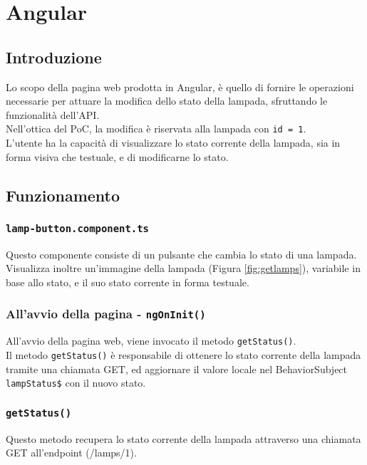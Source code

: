 \chapter{Angular}\label{angular}

\section{Introduzione}

Lo scopo della pagina web prodotta in Angular, è quello di fornire le operazioni necessarie per attuare la modifica dello stato della lampada, sfruttando le funzionalità dell'API. \\
Nell'ottica del PoC, la modifica è riservata alla lampada con \texttt{id = 1}. \\
L'utente ha la capacità di visualizzare lo stato corrente della lampada, sia in forma visiva che testuale, e di modificarne lo stato. 

\section{Funzionamento}

\subsection{\texttt{lamp-button.component.ts}}
Questo componente consiste di un pulsante che cambia lo stato di una lampada. Visualizza inoltre un'immagine della lampada (Figura \ref{fig:getlamps}), variabile in base allo stato, e il suo stato corrente in forma testuale.

\subsection{All'avvio della pagina - \texttt{ngOnInit()}}
All'avvio della pagina web, viene invocato il metodo \texttt{getStatus()}.\\
Il metodo \texttt{getStatus()} è responsabile di ottenere lo stato corrente della lampada tramite una chiamata GET, ed aggiornare il valore locale nel BehaviorSubject \texttt{lampStatus\$} con il nuovo stato.

\subsection{\texttt{getStatus()}}
Questo metodo recupera lo stato corrente della lampada attraverso una chiamata GET all'endpoint (/lamps/1). \\

